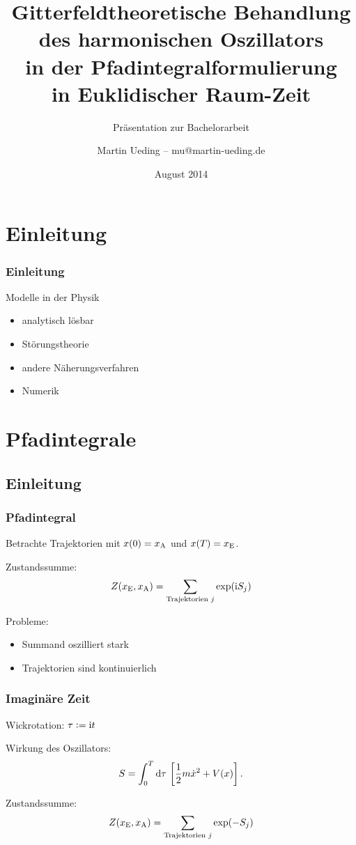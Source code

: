 \documentclass[ngerman, fleqn]{beamer}
\title{%
    Gitterfeldtheoretische Behandlung\\
    des harmonischen Oszillators\\
    in der Pfadintegralformulierung\\
    in Euklidischer Raum-Zeit
}
\subtitle{Präsentation zur Bachelorarbeit}
\author{Martin Ueding – mu@martin-ueding.de}
\date{August 2014}
\renewcommand\iup{\text i}
\begin{document}
\begin{frame}
    \titlepage
\end{frame}

\section*{Einleitung}

\begin{frame}
    \frametitle{Einleitung}

    Modelle in der Physik

    \begin{itemize}
        \item
            analytisch lösbar
        \item
            Störungstheorie
        \item
            andere Näherungsverfahren
        \item
            Numerik
    \end{itemize}
\end{frame}

\begin{frame}
    \tableofcontents
\end{frame}

\section{Pfadintegrale}

\frame\sectionpage

\subsection{Einleitung}

\begin{frame}
    \frametitle{Pfadintegral}

    Betrachte Trajektorien mit $x(0) = x_\text A$ und $x(T) = x_\text E$.

    Zustandssumme:
    \[
        Z(x_\text E, x_\text A) = \sum_{\text{Trajektorien $j$}} \exp(\iup S_j)
    \]

    Probleme:
    \begin{itemize}
        \item Summand oszilliert stark
        \item Trajektorien sind kontinuierlich
    \end{itemize}
\end{frame}

\begin{frame}
    \frametitle{Imaginäre Zeit}

    Wickrotation: $\tau := \iup t$

    Wirkung des Oszillators:
    \[
        S = \int_0^T \dif \tau \, \sbr{\frac 12 m \dot x^2 + V(x)}.
    \]

    Zustandssumme:
    \[
        Z(x_\text E, x_\text A) = \sum_{\text{Trajektorien $j$}} \exp(- S_j)
    \]
\end{frame}
\end{document}
